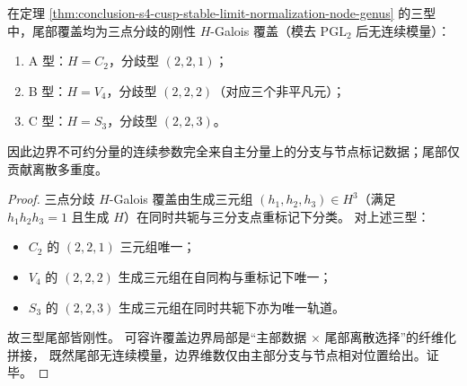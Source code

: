 \begin{proposition}\label{prop:conclusion-s4-cusp-tail-three-point-rigidity-and-boundary-moduli}
在定理 \ref{thm:conclusion-s4-cusp-stable-limit-normalization-node-genus} 的三型中，尾部覆盖均为三点分歧的刚性 \(H\)-Galois 覆盖（模去 \(\mathrm{PGL}_2\) 后无连续模量）：
\begin{enumerate}
  \item A 型：\(H=C_2\)，分歧型 \((2,2,1)\)；
  \item B 型：\(H=V_4\)，分歧型 \((2,2,2)\)（对应三个非平凡元）；
  \item C 型：\(H=S_3\)，分歧型 \((2,2,3)\)。
\end{enumerate}
因此边界不可约分量的连续参数完全来自主分量上的分支与节点标记数据；尾部仅贡献离散多重度。
\end{proposition}
\begin{proof}
三点分歧 \(H\)-Galois 覆盖由生成三元组
\((h_1,h_2,h_3)\in H^3\)（满足 \(h_1h_2h_3=1\) 且生成 \(H\)）在同时共轭与三分支点重标记下分类。
对上述三型：
\begin{itemize}
  \item \(C_2\) 的 \((2,2,1)\) 三元组唯一；
  \item \(V_4\) 的 \((2,2,2)\) 生成三元组在自同构与重标记下唯一；
  \item \(S_3\) 的 \((2,2,3)\) 生成三元组在同时共轭下亦为唯一轨道。
\end{itemize}
故三型尾部皆刚性。
可容许覆盖边界局部是“主部数据 \(\times\) 尾部离散选择”的纤维化拼接，
既然尾部无连续模量，边界维数仅由主部分支与节点相对位置给出。证毕。
\end{proof}

